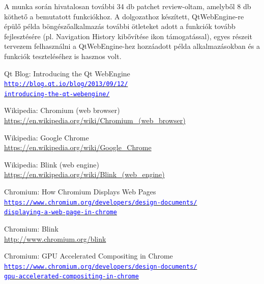 \documentclass[12pt]{report}
\let\orighref\href
\renewcommand{\href}[2]{%
    \orighref{#1}{\textcolor{blue}{\texttt{#2}}}
}
\let\origurl\url
\renewcommand{\url}[1]{%
    \textcolor{blue}{\origurl{#1}}
}
\begin{document}
A munka során hivatalosan további 34 db patchet review-oltam, amelyből 8 db köthető a
bemutatott funkciókhoz. A dolgozathoz készített, QtWebEngine-re épülő példa
böngészőalkalmazás további ötleteket adott a funkciók tovább fejlesztésére (pl. Navigation
History kibővítése ikon támogatással), egyes részeit tervezem felhasználni a QtWebEngine-hez
hozzáadott példa alkalmazásokban és a funkciók teszteléséhez is hasznos volt.



\begin{thebibliography}{9}

        Qt Blog: Introducing the Qt WebEngine \\
        \href{http://blog.qt.io/blog/2013/09/12/introducing-the-qt-webengine/}
        {http://blog.qt.io/blog/2013/09/12/\\
        introducing-the-qt-webengine/}

        Wikipedia: Chromium (web browser) \\
        \url{https://en.wikipedia.org/wiki/Chromium_(web_browser)}

        Wikipedia: Google Chrome \\
        \url{https://en.wikipedia.org/wiki/Google_Chrome}

        Wikipedia: Blink (web engine) \\
        \url{https://en.wikipedia.org/wiki/Blink_(web_engine)}

        Chromium: How Chromium Displays Web Pages \\
        \href{https://www.chromium.org/developers/design-documents/displaying-a-web-page-in-chrome}
        {https://www.chromium.org/developers/design-documents/\\
         displaying-a-web-page-in-chrome}

        Chromium: Blink \\
        \url{http://www.chromium.org/blink}

        Chromium: GPU Accelerated Compositing in Chrome \\
        \href{https://www.chromium.org/developers/design-documents/gpu-accelerated-compositing-in-chrome}
        {https://www.chromium.org/developers/design-documents/\\
        gpu-accelerated-compositing-in-chrome}


\end{thebibliography}
\end{document}
